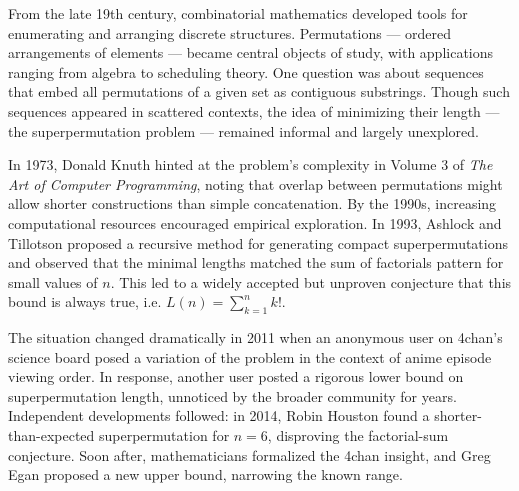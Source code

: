 \begin{historical}
From the late 19th century, combinatorial mathematics developed tools for enumerating and arranging discrete structures. Permutations — ordered arrangements of elements — became central objects of study, with applications ranging from algebra to scheduling theory. One question was about sequences that embed all permutations of a given set as contiguous substrings. Though such sequences appeared in scattered contexts, the idea of minimizing their length — the superpermutation problem — remained informal and largely unexplored.

In 1973, Donald Knuth hinted at the problem's complexity in Volume 3 of \textit{The Art of Computer Programming}, noting that overlap between permutations might allow shorter constructions than simple concatenation. By the 1990s, increasing computational resources encouraged empirical exploration. In 1993, Ashlock and Tillotson proposed a recursive method for generating compact superpermutations and observed that the minimal lengths matched the sum of factorials pattern for small values of $n$. This led to a widely accepted but unproven conjecture that this bound is always true, i.e. $L(n) = \sum_{k=1}^{n} k!$.

The situation changed dramatically in 2011 when an anonymous user on 4chan’s science board posed a variation of the problem in the context of anime episode viewing order. In response, another user posted a rigorous lower bound on superpermutation length, unnoticed by the broader community for years. Independent developments followed: in 2014, Robin Houston found a shorter-than-expected superpermutation for $n = 6$, disproving the factorial-sum conjecture. Soon after, mathematicians formalized the 4chan insight, and Greg Egan proposed a new upper bound, narrowing the known range.

\end{historical}